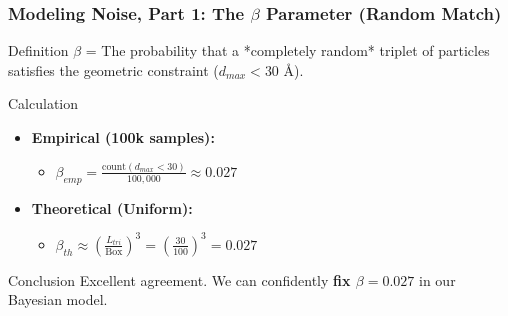 \documentclass[a4paper,8pt]{beamer}
\begin{document}
\begin{frame}
\frametitle{Modeling Noise, Part 1: The $\beta$ Parameter (Random Match)}
    
    \begin{block}{Definition}
        \textbf{$\beta$} = The probability that a *completely random* triplet of particles
        satisfies the geometric constraint ($d_{max} < 30$ \AA).
    \end{block}
    
    \begin{block}{Calculation}
        \begin{itemize}
            \item \textbf{Empirical (100k samples):}
            \begin{itemize}
                \item $\beta_{emp} = \frac{\text{count}(d_{max} < 30)}{100,000} \approx 0.027$
            \end{itemize}
            \vspace{0.3cm}
            \item \textbf{Theoretical (Uniform):}
            \begin{itemize}
                \item $\beta_{th} \approx (\frac{L_{tri}}{\text{Box}})^3 = (\frac{30}{100})^3 = 0.027$
            \end{itemize}
        \end{itemize}
    \end{block}
    
    \vfill
    
    \begin{alertblock}{Conclusion}
        Excellent agreement. We can confidently \textbf{fix $\beta = 0.027$} in our Bayesian model.
    \end{alertblock}

\end{frame}
\end{document}
